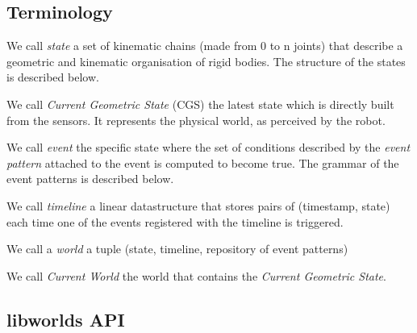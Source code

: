\documentclass[a4paper]{article}
\begin{document}
\subsection{
  Terminology%
  \label{terminology}%
}

We call \emph{state} a set of kinematic chains (made from 0 to n
joints) that describe a geometric and kinematic organisation of
rigid bodies. The structure of the states is described below.

We call \emph{Current Geometric State} (CGS) the latest state which
is directly built from the sensors. It represents the physical
world, as perceived by the robot.

We call \emph{event} the specific state where the set of conditions
described by the \emph{event pattern} attached to the event is computed
to become true.
The grammar of the event patterns is described below.

We call \emph{timeline} a linear datastructure that stores pairs of
(timestamp, state) each time one of the events registered with the
timeline is triggered.

We call a \emph{world} a tuple (state, timeline, repository of event
patterns)

We call \emph{Current World} the world that contains the \emph{Current Geometric State}.



\subsection{
  libworlds API%
  \label{libworlds-api}%
}
\end{document}
